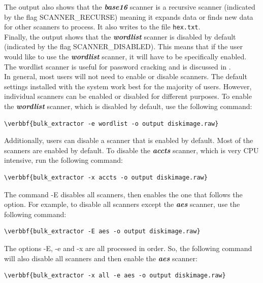 \documentclass[11pt]{article} %
\begin{document}
The output also shows that the  \textbf{\textit{base16}} scanner is a recursive scanner (indicated by the flag SCANNER\_RECURSE) meaning it expands data or finds new data for other scanners to process. It also writes to the file \texttt{hex.txt}.\\

Finally, the output shows that the  \textbf{\textit{wordlist}} scanner is disabled by default (indicated by the flag SCANNER\_DISABLED). This means that if the user would like to use the  \textbf{\textit{wordlist}} scanner, it will have to be specifically enabled. The wordlist scanner is useful for password cracking and is discussed in \textbf{}. \\

In general, most users will not need to enable or disable scanners. The default settings installed with the \bulk system work best for the majority of users. However, individual scanners can be enabled or disabled for different purposes. To enable the  \textbf{\textit{wordlist}} scanner, which is disabled by default, use the following command:
\begin{Verbatim}[commandchars=\\\{\}]
\verbbf{bulk_extractor -e wordlist -o output diskimage.raw}
\end{Verbatim} 

Additionally, users can disable a scanner that is enabled by default. Most of the scanners are enabled by default. To disable the  \textbf{\textit{accts}} scanner, which is very CPU intensive, run the following command:
\begin{Verbatim}[commandchars=\\\{\}]
\verbbf{bulk_extractor -x accts -o output diskimage.raw} 
\end{Verbatim}

The command -E disables all scanners, then enables the one that follows the option. For example, to disable all scanners except the \textbf{\textit{aes}} scanner, use the following command:
\begin{Verbatim}[commandchars=\\\{\}]
\verbbf{bulk_extractor -E aes -o output diskimage.raw}
\end{Verbatim} 

The options -E, -e and -x are all processed in order. So, the following command will also disable all scanners and then enable the \textbf{\textit{aes}} scanner: 
\begin{Verbatim}[commandchars=\\\{\}]
\verbbf{bulk_extractor -x all -e aes -o output diskimage.raw}
\end{Verbatim} 
\end{document}
